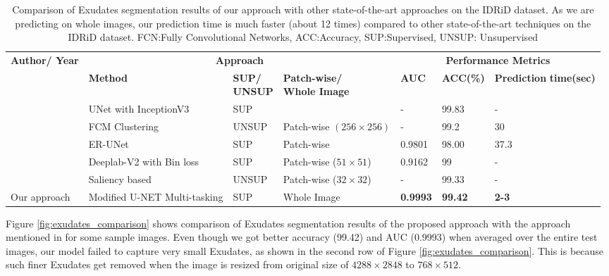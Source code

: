 \documentclass[utf8]{FrontiersinHarvard} %
\begin{document}
\begin{table}[!h]
\centering
\caption{Comparison of Exudates segmentation results of our approach with other state-of-the-art approaches on the IDRiD dataset. As we are predicting on whole images, our prediction time is much faster (about 12 times) compared to other state-of-the-art techniques on the IDRiD dataset. FCN:Fully Convolutional Networks, ACC:Accuracy, SUP:Supervised, UNSUP: Unsupervised}
\label{tab:result_comparison_ex}
\vspace{2mm}
\begin{tabular}{|p{2.5cm}|p{3.3cm}|p{1.4cm}|p{2.4cm}|p{1.2cm}|p{1.5cm}|p{2cm}|}
\hline
\textbf{Author/ Year} &  \multicolumn{3}{|c|}{\textbf{Approach}}   & \multicolumn{3}{|c|}{\textbf{Performance Metrics}}  \\
\cline{2-7}
&\textbf{Method} &\textbf{SUP/ \newline UNSUP} &   \textbf{Patch-wise/ \newline Whole Image} &\textbf{AUC} & \textbf{ACC(\%)} & \textbf{Prediction} \newline \textbf{time(sec)}\\
\hline
%
\cite{kaur2022uniconv}  & UNet with \newline InceptionV3 & SUP & &  - & 99.83 & - \\
\hline
\cite{hamad2020exudates}  & FCM Clustering & UNSUP & Patch-wise \newline $(256 \times 256)$  & -  & 99.2 & 30 \\
\hline

\cite{kou2020enhanced}  & ER-UNet & SUP & Patch-wise &   0.9801 & 98.00 & 37.3 \\
\hline
\cite{guo2020bin}  &  Deeplab-V2 \newline with Bin loss & SUP & Patch-wise \newline ($51\times51$) & 0.9162 & 99 & - \\
\hline
\cite{nur2018exudate}  & Saliency based & UNSUP & Patch-wise \newline ($32\times32$) & - & 99.33 & - \\
\hline
Our approach & Modified U-NET \newline Multi-tasking & SUP & Whole Image & \textbf{0.9993} & \textbf{99.42} & \textbf{2-3} \\

\hline
\end{tabular}
\end{table}

Figure \ref{fig:exudates_comparison} shows comparison of Exudates segmentation results of the proposed approach with the approach mentioned in \cite{guo2020bin} for some sample images. Even though we got better  accuracy (99.42) and AUC (0.9993) when averaged over the entire test images, our model failed to capture very small Exudates, as shown in the second row of Figure \ref{fig:exudates_comparison}. This is because such finer Exudates get removed when the image is resized from original size of $4288 \times 2848$ to $768 \times 512$.
\end{document}
